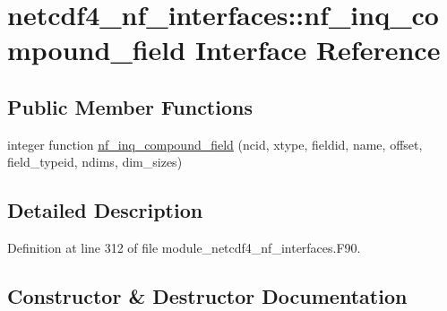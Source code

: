 \hypertarget{interfacenetcdf4__nf__interfaces_1_1nf__inq__compound__field}{}\section{netcdf4\+\_\+nf\+\_\+interfaces\+:\+:nf\+\_\+inq\+\_\+compound\+\_\+field Interface Reference}
\label{interfacenetcdf4__nf__interfaces_1_1nf__inq__compound__field}
\subsection*{Public Member Functions}
\begin{DoxyCompactItemize}
\item 
integer function \hyperlink{interfacenetcdf4__nf__interfaces_1_1nf__inq__compound__field_a5b70885f053e7fb96a57f719b82ae68d}{nf\+\_\+inq\+\_\+compound\+\_\+field} (ncid, xtype, fieldid, name, offset, field\+\_\+typeid, ndims, dim\+\_\+sizes)
\end{DoxyCompactItemize}


\subsection{Detailed Description}


Definition at line 312 of file module\+\_\+netcdf4\+\_\+nf\+\_\+interfaces.\+F90.



\subsection{Constructor \& Destructor Documentation}
\mbox{\label{interfacenetcdf4__nf__interfaces_1_1nf__inq__compound__field_a5b70885f053e7fb96a57f719b82ae68d}} 
